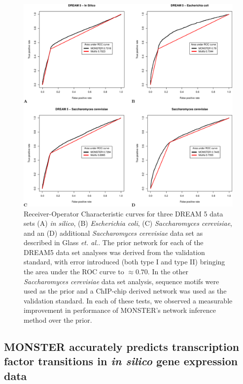 \begin{figure}
\includegraphics[width=1\linewidth]{figures/SupportingFigure2.pdf}
\caption{Receiver-Operator Characteristic curves for three DREAM 5 data sets
(A) \emph{in silico}, (B) \emph{Escherichia coli}, (C) \emph{Saccharomyces cerevisiae}, and an (D) additional \emph{Saccharomyces cerevisiae} data set as described  in Glass \emph{et. al.}\cite{glass2013passing}. The prior network for each of the DREAM5 data set analyses was derived from the validation standard, with error introduced (both type I and type II) bringing the area under the ROC curve to $\approx0.70$. In the other \emph{Saccharomyces cerevisiae} data set analysis, sequence motifs were used as the prior and a ChIP-chip derived network was used as the validation standard. In each of these tests, we observed a measurable improvement in performance of MONSTER's network inference method over the prior.}
\label{fig:Supplement_validation}
\end{figure}


\subsection*{MONSTER accurately predicts transcription factor transitions in \emph{in silico} gene expression data} 

